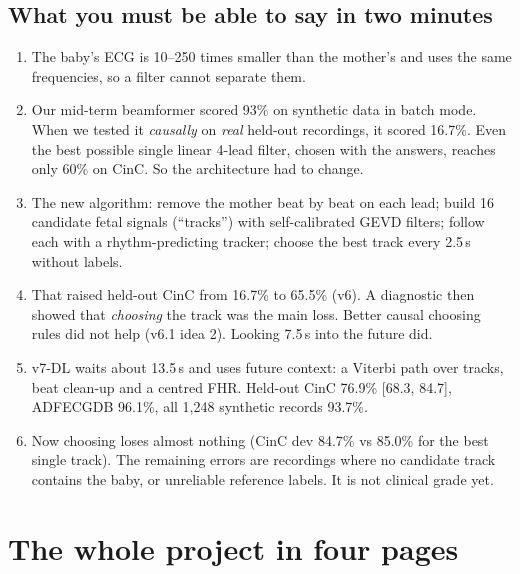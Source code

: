 \documentclass[11pt]{article}
\begin{document}
\subsection{What you must be able to say in two minutes}
\begin{lesson}
\begin{enumerate}
  \item The baby's ECG is 10--250 times smaller than the mother's and uses the same frequencies, so a filter cannot separate them.
  \item Our mid-term beamformer scored 93\% on synthetic data in batch mode. When we tested it \emph{causally} on \emph{real} held-out recordings, it scored 16.7\%. Even the best possible single linear 4-lead filter, chosen with the answers, reaches only 60\% on CinC. So the architecture had to change.
  \item The new algorithm: remove the mother beat by beat on each lead; build 16 candidate fetal signals (``tracks'') with self-calibrated GEVD filters; follow each with a rhythm-predicting tracker; choose the best track every 2.5\,s without labels.
  \item That raised held-out CinC from 16.7\% to 65.5\% (v6). A diagnostic then showed that \emph{choosing} the track was the main loss. Better causal choosing rules did not help (v6.1 idea 2). Looking 7.5\,s into the future did.
  \item v7-DL waits about 13.5\,s and uses future context: a Viterbi path over tracks, beat clean-up and a centred FHR. Held-out CinC 76.9\% [68.3, 84.7], ADFECGDB 96.1\%, all 1,248 synthetic records 93.7\%.
  \item Now choosing loses almost nothing (CinC dev 84.7\% vs 85.0\% for the best single track). The remaining errors are recordings where no candidate track contains the baby, or unreliable reference labels. It is not clinical grade yet.
\end{enumerate}
\end{lesson}

\newpage
\section{The whole project in four pages}
\label{sec:project}
\end{document}
